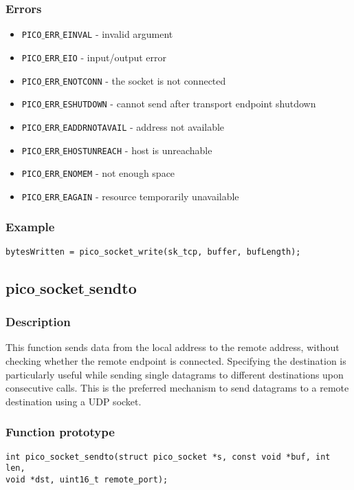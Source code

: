 \subsubsection*{Errors}
\begin{itemize}[noitemsep]
\item \texttt{PICO$\_$ERR$\_$EINVAL} - invalid argument
\item \texttt{PICO$\_$ERR$\_$EIO} - input/output error
\item \texttt{PICO$\_$ERR$\_$ENOTCONN} - the socket is not connected
\item \texttt{PICO$\_$ERR$\_$ESHUTDOWN} - cannot send after transport endpoint shutdown
\item \texttt{PICO$\_$ERR$\_$EADDRNOTAVAIL} - address not available
\item \texttt{PICO$\_$ERR$\_$EHOSTUNREACH} - host is unreachable
\item \texttt{PICO$\_$ERR$\_$ENOMEM} - not enough space
\item \texttt{PICO$\_$ERR$\_$EAGAIN} - resource temporarily unavailable
\end{itemize}

\subsubsection*{Example}
\begin{verbatim}
bytesWritten = pico_socket_write(sk_tcp, buffer, bufLength);
\end{verbatim}


\subsection{pico$\_$socket$\_$sendto}

\subsubsection*{Description}
This function sends data from the local address to the remote address, without checking
whether the remote endpoint is connected. Specifying the destination is particularly useful while sending single datagrams
to different destinations upon consecutive calls. This is the preferred mechanism to send datagrams to a remote destination
using a UDP socket.

\subsubsection*{Function prototype}
\begin{verbatim}
int pico_socket_sendto(struct pico_socket *s, const void *buf, int len,
void *dst, uint16_t remote_port);
\end{verbatim}

